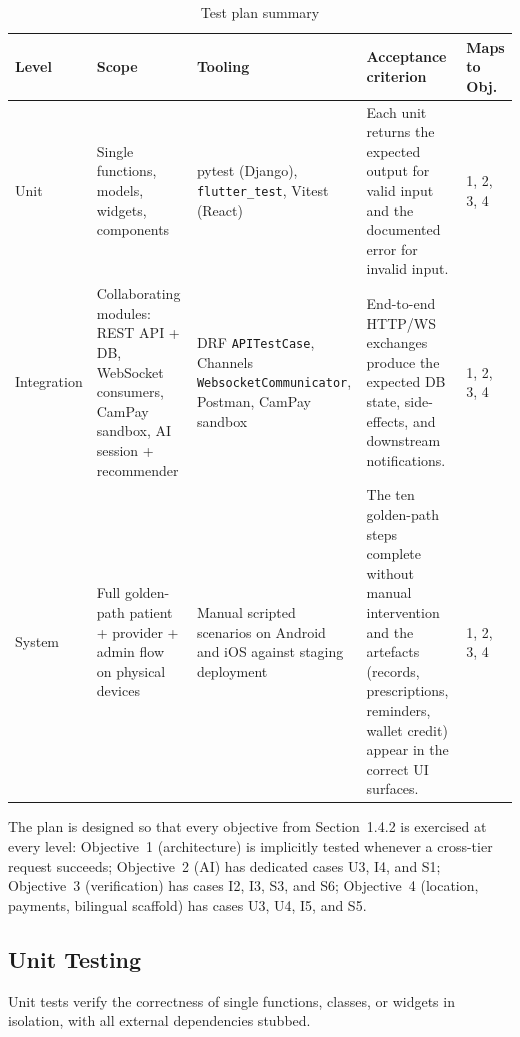 \begin{table}[H]
\centering
\caption{Test plan summary}
\label{tab:test-plan}
\small
\begin{tabularx}{\textwidth}{|p{2.2cm}|p{3.2cm}|p{3.0cm}|X|p{2.0cm}|}
\hline
\textbf{Level} & \textbf{Scope} & \textbf{Tooling} & \textbf{Acceptance criterion} & \textbf{Maps to Obj.} \\ \hline
Unit & Single functions, models, widgets, components & pytest (Django), \texttt{flutter\_test}, Vitest (React) & Each unit returns the expected output for valid input and the documented error for invalid input. & 1, 2, 3, 4 \\ \hline
Integration & Collaborating modules: REST API + DB, WebSocket consumers, CamPay sandbox, AI session + recommender & DRF \texttt{APITestCase}, Channels \texttt{WebsocketCommunicator}, Postman, CamPay sandbox & End-to-end HTTP/WS exchanges produce the expected DB state, side-effects, and downstream notifications. & 1, 2, 3, 4 \\ \hline
System & Full golden-path patient + provider + admin flow on physical devices & Manual scripted scenarios on Android and iOS against staging deployment & The ten golden-path steps complete without manual intervention and the artefacts (records, prescriptions, reminders, wallet credit) appear in the correct UI surfaces. & 1, 2, 3, 4 \\ \hline
\end{tabularx}
\end{table}

The plan is designed so that every objective from Section~1.4.2 is exercised at every level: Objective~1 (architecture) is implicitly tested whenever a cross-tier request succeeds; Objective~2 (AI) has dedicated cases U3, I4, and S1; Objective~3 (verification) has cases I2, I3, S3, and S6; Objective~4 (location, payments, bilingual scaffold) has cases U3, U4, I5, and S5.

\subsection{Unit Testing}

Unit tests verify the correctness of single functions, classes, or widgets in isolation, with all external dependencies stubbed.


